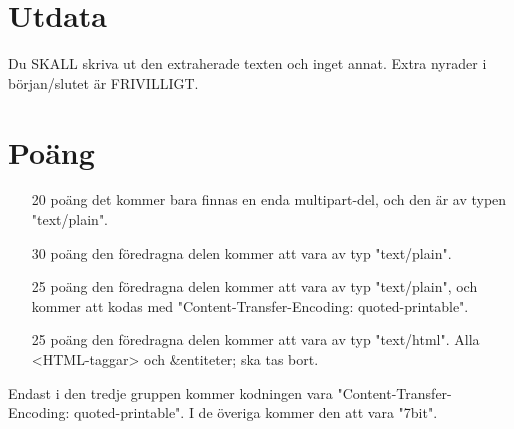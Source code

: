 \section*{Utdata}
Du SKALL skriva ut den extraherade texten och inget annat. Extra nyrader i början/slutet är FRIVILLIGT.

\section*{Poäng}

\begin{enumerate}
	\item[20 poäng] det kommer bara finnas en enda multipart-del, och den är av typen "text/plain".
	\item[30 poäng] den föredragna delen kommer att vara av typ "text/plain".
	\item[25 poäng] den föredragna delen kommer att vara av typ "text/plain", och kommer att kodas med "Content-Transfer-Encoding: quoted-printable".
  \item[25 poäng] den föredragna delen kommer att vara av typ "text/html". Alla <HTML-taggar> och \&entiteter; ska tas bort.
\end{enumerate}

Endast i den tredje gruppen kommer kodningen vara "Content-Transfer-Encoding: quoted-printable". I de överiga kommer den att vara "7bit".
